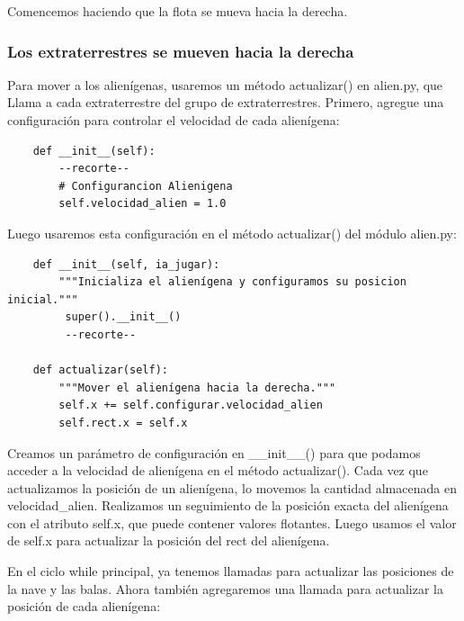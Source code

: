 Comencemos haciendo que la flota se mueva hacia la derecha.

\subsubsection{Los extraterrestres se mueven hacia la derecha}

Para mover a los alienígenas, usaremos un método {\ttfamily actualizar()} en {\ttfamily alien.py}, que
Llama a cada extraterrestre del grupo de extraterrestres. Primero, agregue una configuración para controlar el
velocidad de cada alienígena:


\hspace{-2.75cm}{\ttfamily \scriptsize configurar.py}  \vspace{-0.5cm}
\begin{lstlisting}		
    def __init__(self):
        --recorte--
        # Configurancion Alienigena
        self.velocidad_alien = 1.0
\end{lstlisting}

Luego usaremos esta configuración en el método {\ttfamily actualizar()} del módulo {\ttfamily alien.py}:


\hspace{-2.5cm}{\ttfamily \scriptsize alien.py}  \vspace{-0.5cm}
\begin{lstlisting}		
    def __init__(self, ia_jugar):
        """Inicializa el alienígena y configuramos su posicion inicial."""
         super().__init__() 
         --recorte--
         
    def actualizar(self):
        """Mover el alienígena hacia la derecha."""
        self.x += self.configurar.velocidad_alien
        self.rect.x = self.x
\end{lstlisting}




Creamos un parámetro de configuración en {\ttfamily \_\_init\_\_()} para que podamos acceder a la 
velocidad  de alienígena  en el método {\ttfamily actualizar()}. Cada vez que actualizamos la posición de un alienígena, 
lo movemos la cantidad almacenada en {\ttfamily velocidad\_alien}. Realizamos un seguimiento de la posición exacta del alienígena con el atributo {\ttfamily self.x}, que puede contener valores flotantes. Luego usamos el valor de {\ttfamily self.x} para actualizar la posición del {\ttfamily rect} del alienígena. 

En el ciclo while principal, ya tenemos llamadas para actualizar las posiciones de la nave y las balas. Ahora también agregaremos una llamada para actualizar la posición de cada alienígena:

